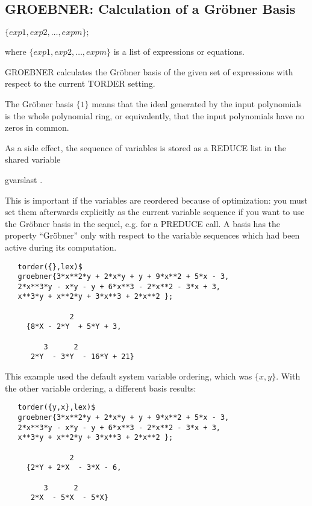 \subsection{GROEBNER: Calculation of a Gr\"obner Basis}
\begin{description}
\item[{\it GROEBNER}] $\{exp1, exp2, \ldots , expm\}; $

where $\{exp1, exp2, \ldots , expm\}$ is a list of
expressions or equations.

GROEBNER calculates the Gr\"obner basis of the given set of
expressions with respect to the current TORDER setting.

The Gr\"obner basis $\{1\}$ means that the ideal generated by the
input polynomials is the whole polynomial ring, or equivalently, that
the input polynomials have no zeros in common.

As a side effect, the sequence of variables is stored as a REDUCE list
in the shared variable
\begin{center}
gvarslast .
\end{center}

This is important if the variables are reordered because of optimization:
you must set them afterwards explicitly as the current variable sequence
if you want to use the Gr\"obner basis in the sequel, e.g. for a
PREDUCE call. A basis has the property ``Gr\"obner'' only with respect
to the variable sequences which had been active during its computation.
\end{description}

\example {}
\begin{verbatim}
   torder({},lex)$
   groebner{3*x**2*y + 2*x*y + y + 9*x**2 + 5*x - 3,
   2*x**3*y - x*y - y + 6*x**3 - 2*x**2 - 3*x + 3,
   x**3*y + x**2*y + 3*x**3 + 2*x**2 };

               2
     {8*X - 2*Y  + 5*Y + 3,

         3      2
      2*Y  - 3*Y  - 16*Y + 21}
\end{verbatim}


This example used the default system variable ordering, which was
$\{x,y\}$. With the other variable ordering, a different basis results:

\begin{verbatim}
   torder({y,x},lex)$
   groebner{3*x**2*y + 2*x*y + y + 9*x**2 + 5*x - 3,
   2*x**3*y - x*y - y + 6*x**3 - 2*x**2 - 3*x + 3,
   x**3*y + x**2*y + 3*x**3 + 2*x**2 };

               2
     {2*Y + 2*X  - 3*X - 6,

         3      2
      2*X  - 5*X  - 5*X}
\end{verbatim}


